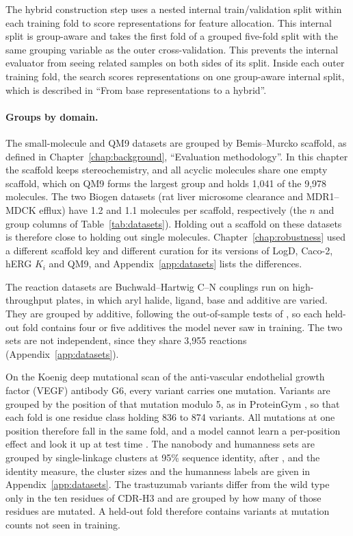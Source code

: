The hybrid construction step uses a nested internal train/validation split within each training fold to score representations for feature allocation. This internal split is group-aware and takes the first fold of a grouped five-fold split with the same grouping variable as the outer cross-validation. This prevents the internal evaluator from seeing related samples on both sides of its split.
Inside each outer training fold, the search scores representations on one group-aware internal split, which is described in ``From base representations to a hybrid''.

\paragraph{Groups by domain.} The small-molecule and QM9 datasets are grouped by Bemis--Murcko scaffold, as defined in Chapter~\ref{chap:background}, ``Evaluation methodology''. In this chapter the scaffold keeps stereochemistry, and all acyclic molecules share one empty scaffold, which on QM9 forms the largest group and holds 1,041 of the 9,978 molecules. The two Biogen datasets (rat liver microsome clearance and MDR1--MDCK efflux) have 1.2 and 1.1 molecules per scaffold, respectively (the $n$ and group columns of Table~\ref{tab:datasets}). Holding out a scaffold on these datasets is therefore close to holding out single molecules. Chapter~\ref{chap:robustness} used a different scaffold key and different curation for its versions of LogD, Caco-2, hERG $K_i$ and QM9, and Appendix~\ref{app:datasets} lists the differences.

The reaction datasets are Buchwald--Hartwig C--N couplings run on high-throughput plates, in which aryl halide, ligand, base and additive are varied. They are grouped by additive, following the out-of-sample tests of \citet{Ahneman2018}, so each held-out fold contains four or five additives the model never saw in training. The two sets are not independent, since they share 3,955 reactions (Appendix~\ref{app:datasets}).

On the Koenig deep mutational scan of the anti-vascular endothelial growth factor (VEGF) antibody G6, every variant carries one mutation. Variants are grouped by the position of that mutation modulo 5, as in ProteinGym \citep{Notin2023}, so that each fold is one residue class holding 836 to 874 variants. All mutations at one position therefore fall in the same fold, and a model cannot learn a per-position effect and look it up at test time \citep{Vieira2026}. The nanobody and humanness sets are grouped by single-linkage clusters at 95\% sequence identity, after \citet{Kenlay2024}, and the identity measure, the cluster sizes and the humanness labels are given in Appendix~\ref{app:datasets}. The trastuzumab variants differ from the wild type only in the ten residues of CDR-H3 and are grouped by how many of those residues are mutated. A held-out fold therefore contains variants at mutation counts not seen in training.

